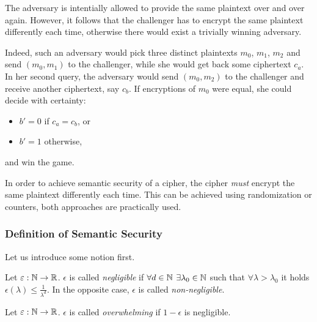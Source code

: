 \begin{note}   %
\label{note:ambigencr}
	The adversary is intentially allowed to provide the same plaintext over and over again. However, it follows that the challenger has to encrypt the same plaintext differently each time, otherwise there would exist a trivially winning adversary.
	
	Indeed, such an adversary would pick three distinct plaintexts $m_0$, $m_1$, $m_2$ and send $(m_0,m_1)$ to the challenger, while she would get back some ciphertext $c_a$. In her second query, the adversary would send $(m_0,m_2)$ to the challenger and receive another ciphertext, say $c_b$. If encryptions of $m_0$ were equal, she could decide with certainty:
	\begin{itemize}
		\item $b' = 0$ if $c_a = c_b$, or
		\item $b' = 1$ otherwise,
	\end{itemize}
	and win the game.
\end{note}

\begin{note}   %
\label{note:randomize}
	In order to achieve semantic security of a cipher, the cipher {\em must} encrypt the same plaintext differently each time. This can be achieved using randomization or counters, both approaches are practically used.
\end{note}


\subsubsection{Definition of Semantic Security}

Let us introduce some notion first.

\begin{defn}
\label{def:neglfunc}
	Let $\varepsilon:\mathbb{N}\rightarrow\mathbb{R}$. $\epsilon$ is called {\em negligible} if $\forall d\in\mathbb{N}$ $\exists \lambda_0\in\mathbb{N}$ such that $\forall \lambda>\lambda_0$ it holds $\epsilon(\lambda)\leq\frac{1}{\lambda^d}$. In the opposite case, $\epsilon$ is called {\em non-negligible}.
\end{defn}

\begin{defn}
\label{def:overwh}
	Let $\varepsilon:\mathbb{N}\rightarrow\mathbb{R}$. $\epsilon$ is called {\em overwhelming} if $1-\epsilon$ is negligible.
\end{defn}


